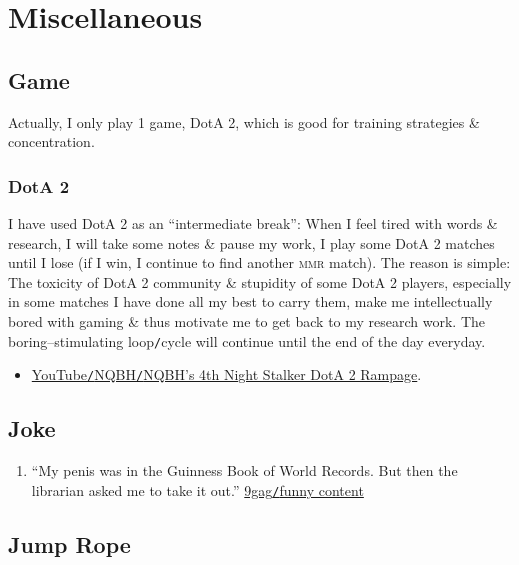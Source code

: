 \documentclass[oneside]{book}
\numberwithin{equation}{section}
\begin{document}

\chapter{Miscellaneous}

\section{Game}
Actually, I only play 1 game, DotA 2, which is good for training strategies \& concentration.

\subsection{DotA 2}
I have used DotA 2 as an ``intermediate break'': When I feel tired with words \& research, I will take some notes \& pause my work, I play some DotA 2 matches until I lose (if I win, I continue to find another \textsc{mmr} match). The reason is simple: The toxicity of DotA 2 community \& stupidity of some DotA 2 players, especially in some matches I have done all my best to carry them, make me intellectually bored with gaming \& thus motivate me to get back to my research work. The boring--stimulating loop\texttt{/}cycle will continue until the end of the day everyday.

\begin{itemize}
	\item \href{https://www.youtube.com/watch?v=d9vmHp-4f3k}{YouTube\texttt{/}NQBH\texttt{/}NQBH's 4th Night Stalker DotA 2 Rampage}.
\end{itemize}

\section{Joke}

\begin{enumerate}
	\item ``My penis was in the Guinness Book of World Records. But then the librarian asked me to take it out.'' \href{https://9gag.com/gag/aPZPm6q}{9gag\texttt{/}funny content}
\end{enumerate}

\section{Jump Rope}
\end{document}
